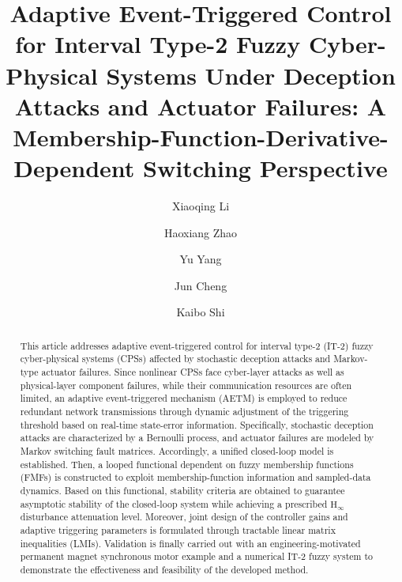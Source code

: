 \documentclass[preprint,review,fleqn,sort&compress,3p]{elsarticle}
\theoremstyle{definition} %
\theoremstyle{definition}%
\begin{document}
	\begin{frontmatter}
		
		\title{{Adaptive Event-Triggered Control for 
				Interval Type-2 Fuzzy Cyber-Physical Systems Under Deception Attacks 
				and Actuator Failures: A Membership-Function-Derivative-Dependent 
				Switching Perspective
		}}
		
		\author[a]{Xiaoqing Li}
		\author[a]{Haoxiang Zhao}
		\author[a]{Yu Yang}
		\author[b]{Jun Cheng}
		\author[c]{Kaibo Shi}
		
		\address[a]{School of Electrical Engineering and Automation, Hefei University of Technology, Hefei 230009, China}
		\address[b]{College of Mathematics and Statistics, Guangxi Normal University, Guilin 541006, China}
		\address[c]{School of Electronic Information and Electrical Engineering, Chengdu University, Chengdu 610106, China}
		
		{}
		
		\begin{abstract}
			This article addresses adaptive event-triggered control for interval type-2 (IT-2) fuzzy cyber-physical systems (CPSs) affected by stochastic deception attacks and Markov-type actuator failures. Since nonlinear CPSs face cyber-layer attacks as well as physical-layer component failures, while their communication resources are often limited, an adaptive event-triggered mechanism (AETM) is employed to reduce redundant network transmissions through dynamic adjustment of the triggering threshold based on real-time state-error information. Specifically, stochastic deception attacks are characterized by a Bernoulli process, and actuator failures are modeled by Markov switching fault matrices. Accordingly, a unified closed-loop model is established. Then, a looped functional dependent on fuzzy membership functions (FMFs) is constructed to exploit membership-function information and sampled-data dynamics. Based on this functional, stability criteria are obtained to guarantee asymptotic stability of the closed-loop system while achieving a prescribed $\mathrm{H}_\infty$ disturbance attenuation level. Moreover, joint design of the controller gains and adaptive triggering parameters is formulated through tractable linear matrix inequalities (LMIs). Validation is finally carried out with an engineering-motivated permanent magnet synchronous motor example and a numerical IT-2 fuzzy system to demonstrate the effectiveness and feasibility of the developed method.
			

\end{abstract}
\end{frontmatter}
\end{document}
